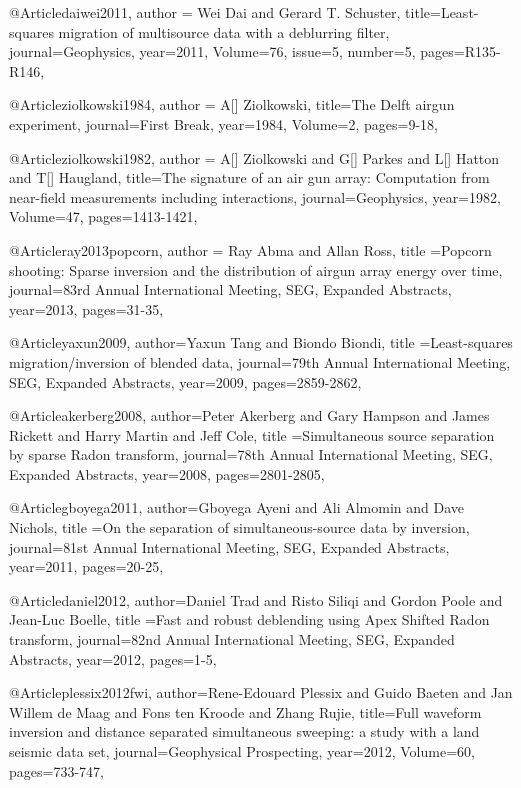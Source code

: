 @Article{daiwei2011,
  author = {Wei Dai and Gerard T. Schuster},
  title={Least-squares migration of multisource data with a deblurring filter},
  journal={Geophysics},
  year=2011,
  Volume=76,
  issue=5,
  number=5,
  pages={R135-R146},
}

	
@Article{ziolkowski1984,
  author = {A[] Ziolkowski},
  title={The Delft airgun experiment},
  journal={First Break},
  year=1984,
  Volume=2,
  pages={9-18},
}

@Article{ziolkowski1982,
  author = {A[] Ziolkowski and G[] Parkes and L[] Hatton and T[] Haugland},
  title={The signature of an air gun array:
Computation from near-field measurements including interactions},
  journal={Geophysics},
  year=1982,
  Volume=47,
  pages={1413-1421},
}

@Article{ray2013popcorn,
  author = {Ray Abma and Allan Ross},
  title ={Popcorn shooting: Sparse inversion and the distribution of airgun array energy over time},
  journal={83rd Annual International Meeting, SEG, Expanded Abstracts},
  year=2013,
  pages={31-35},
}

@Article{yaxun2009,
  author={Yaxun Tang and Biondo Biondi},
  title ={Least-squares migration/inversion of blended data},
  journal={79th Annual International Meeting, SEG, Expanded Abstracts},
  year=2009,
  pages={2859-2862},
}

@Article{akerberg2008,
  author={Peter Akerberg and Gary Hampson and James Rickett and Harry Martin and Jeff Cole},
  title ={Simultaneous source separation by sparse Radon transform},
  journal={78th Annual International Meeting, SEG, Expanded Abstracts},
  year=2008,
  pages={2801-2805},
}

@Article{gboyega2011,
  author={Gboyega Ayeni and Ali Almomin and Dave Nichols},
  title ={On the separation of simultaneous-source data by inversion},
  journal={81st Annual International Meeting, SEG, Expanded Abstracts},
  year=2011,
  pages={20-25},
}

@Article{daniel2012,
  author={Daniel Trad and Risto Siliqi and Gordon Poole and Jean-Luc Boelle},
  title ={Fast and robust deblending using Apex Shifted Radon transform},
  journal={82nd Annual International Meeting, SEG, Expanded Abstracts},
  year=2012,
  pages={1-5},
}

@Article{plessix2012fwi,
  author={Rene-Edouard Plessix and Guido Baeten and Jan Willem de Maag and Fons ten Kroode and Zhang Rujie},
  title={Full waveform inversion and distance separated simultaneous sweeping: a study with a land seismic data set},
  journal={Geophysical Prospecting},
  year=2012,
  Volume=60,
  pages={733-747},
}

